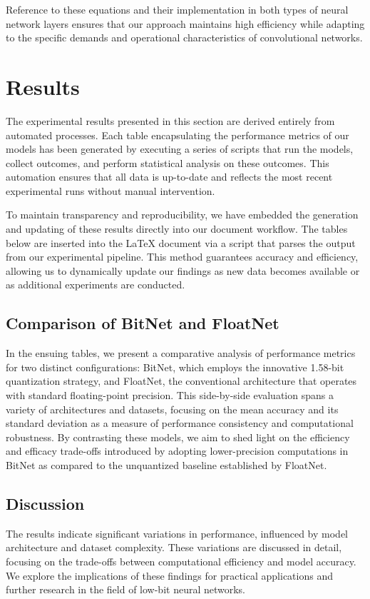 \documentclass{article}
\begin{document}
Reference to these equations and their implementation in both types of neural network layers ensures that our approach maintains high efficiency while adapting to the specific demands and operational characteristics of convolutional networks.


\section{Results}

The experimental results presented in this section are derived entirely from automated processes. Each table encapsulating the performance metrics of our models has been generated by executing a series of scripts that run the models, collect outcomes, and perform statistical analysis on these outcomes. This automation ensures that all data is up-to-date and reflects the most recent experimental runs without manual intervention.

To maintain transparency and reproducibility, we have embedded the generation and updating of these results directly into our document workflow. The tables below are inserted into the LaTeX document via a script that parses the output from our experimental pipeline. This method guarantees accuracy and efficiency, allowing us to dynamically update our findings as new data becomes available or as additional experiments are conducted.

\subsection{Comparison of BitNet and FloatNet}

In the ensuing tables, we present a comparative analysis of performance metrics for two distinct configurations: BitNet, which employs the innovative 1.58-bit quantization strategy, and FloatNet, the conventional architecture that operates with standard floating-point precision. This side-by-side evaluation spans a variety of architectures and datasets, focusing on the mean accuracy and its standard deviation as a measure of performance consistency and computational robustness. By contrasting these models, we aim to shed light on the efficiency and efficacy trade-offs introduced by adopting lower-precision computations in BitNet as compared to the unquantized baseline established by FloatNet.




\subsection{Discussion}

The results indicate significant variations in performance, influenced by model architecture and dataset complexity. These variations are discussed in detail, focusing on the trade-offs between computational efficiency and model accuracy. We explore the implications of these findings for practical applications and further research in the field of low-bit neural networks.





\end{document}
